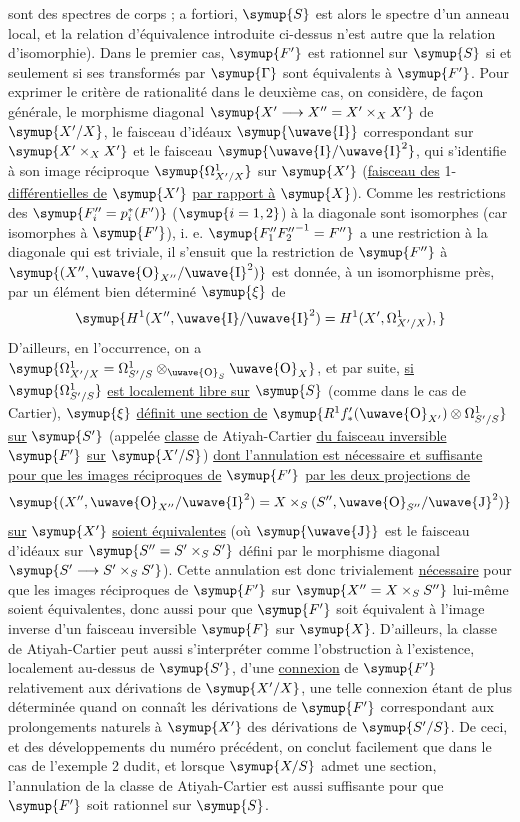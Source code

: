 sont des spectres de corps ; a fortiori, $\symup{S}$ est alors le spectre d'un anneau
local, et la relation d'équivalence introduite ci-dessus n'est autre que la
relation d'isomorphie). Dans le premier cas, $\symup{F'}$ est rationnel sur $\symup{S}$ si et
seulement si ses transformés par $\symup{\Gamma}$ sont équivalents à $\symup{F'}$. Pour
exprimer le critère de rationalité dans le deuxième cas, on considère, de façon
générale, le morphisme diagonal
$\symup{X'\longrightarrow X''=X'\times_XX'}$
de $\symup{X'/X}$, le faisceau d'idéaux $\symup{\text{\uwave{I}}}$ correspondant sur
$\symup{X'\times_XX'}$ et le faisceau $\symup{\text{\uwave{I}}/\text{\uwave{I}}^2}$, qui s'identifie à son
image réciproque $\symup{\Omega^1_{X'/X}}$ sur $\symup{X'}$ (\uline{faisceau des} 1-\uline{différentielles de} $\symup{X'}$ \uline{par rapport à} $\symup{X}$). Comme les restrictions des
$\symup{F''_i=p_i^*(F')}$ ($\symup{i=1,2}$) à la diagonale sont isomorphes (car isomorphes à
$\symup{F'}$), i. e. $\symup{F''_1{F''_2}^{-1}=F''}$ a une restriction à la diagonale qui est
triviale, il s'ensuit que la restriction de $\symup{F''}$ à
$\symup{(X'',\text{\uwave{O}}_{X''}/\text{\uwave{I}}^2)}$ est donnée, à un isomorphisme près, par
un élément bien déterminé $\symup{\xi}$ de
\[
  \symup{H^1(X'',\text{\uwave{I}}/\text{\uwave{I}}^2)
  =H^1(X',\Omega^1_{X'/X}),}
\]
D'ailleurs, en l'occurrence, on a
$\symup{\Omega^1_{X'/X}=\Omega^1_{S'/S}\otimes_{\text{\uwave{O}}_S}\text{\uwave{O}}_X}$,
et par suite, \uline{si} $\symup{\Omega^1_{S'/S}}$ \uline{est localement libre sur} $\symup{S}$ (comme dans le
cas de Cartier), $\symup{\xi}$ \uline{définit une section de}
$\symup{R^1f'_*(\text{\uwave{O}}_{X'})\otimes\Omega^1_{S'/S}}$
\uline{sur} $\symup{S'}$ (appelée \uline{classe} de Atiyah-Cartier \uline{du faisceau inversible} $\symup{F'}$ \uline{sur}
$\symup{X'/S}$) \uline{dont l'annulation est nécessaire et suffisante pour que les images réciproques de} $\symup{F'}$ \uline{par les deux projections de}
\[
  \symup{(X'',\text{\uwave{O}}_{X''}/\text{\uwave{I}}^2)
  =X\times_S(S'',\text{\uwave{O}}_{S''}/\text{\uwave{J}}^2)}
\]
\uline{sur} $\symup{X'}$ \uline{soient équivalentes} (où $\symup{\text{\uwave{J}}}$ est le faisceau d'idéaux sur
$\symup{S''=S'\times_SS'}$ défini par le morphisme diagonal
$\symup{S'\longrightarrow S'\times_SS'}$). Cette annulation est donc trivialement
\uline{nécessaire} pour que les images réciproques de $\symup{F'}$ sur
$\symup{X''=X\times_SS''}$ lui-même soient équivalentes, donc aussi pour que $\symup{F'}$ soit
équivalent à l'image inverse d'un faisceau inversible $\symup{F}$ sur $\symup{X}$. D'ailleurs,
la classe de Atiyah-Cartier peut aussi s'interpréter comme l'obstruction à
l'existence, localement au-dessus de $\symup{S'}$, d'une \uline{connexion} de $\symup{F'}$ relativement
aux dérivations de $\symup{X'/X}$, une telle connexion étant de plus déterminée quand
on connaît les dérivations de $\symup{F'}$ correspondant aux prolongements naturels à
$\symup{X'}$ des dérivations de $\symup{S'/S}$. De ceci, et des développements du numéro
précédent, on conclut facilement que dans le cas de l'exemple 2 dudit,
et lorsque $\symup{X/S}$ admet une section, l'annulation de la classe de
Atiyah-Cartier est aussi suffisante pour que $\symup{F'}$ soit rationnel sur $\symup{S}$.

